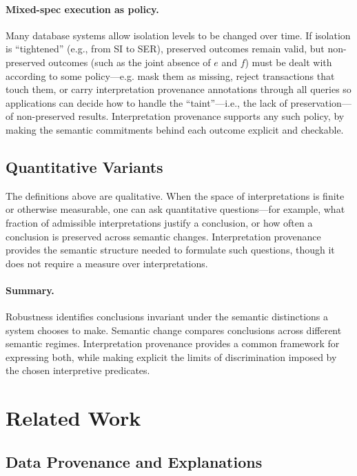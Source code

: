 \documentclass[acmsmall,nonacm]{acmart}
\theoremstyle{remark}
\numberwithin{definition}{section}
\numberwithin{theorem}{section}
\numberwithin{lemma}{section}
\numberwithin{corollary}{section}
\numberwithin{remark}{section}
\numberwithin{example}{section}
\numberwithin{observation}{section}
\numberwithin{assumption}{section}
\begin{document}
\paragraph{Mixed-spec execution as policy.}
Many database systems allow isolation levels to be changed over time.
If isolation is ``tightened'' (e.g., from SI to SER), preserved outcomes remain valid, but
non-preserved outcomes (such as the joint absence of $e$ and $f$) must be dealt with according
to some policy---e.g. mask them as missing, reject transactions that touch them, or
carry interpretation provenance annotations through all queries so applications can decide how
to handle the ``taint''—i.e., the lack of preservation—of non-preserved results.
Interpretation provenance supports any such policy, by making the semantic commitments
behind each outcome explicit and checkable.

\subsection{Quantitative Variants}

The definitions above are qualitative.
When the space of interpretations is finite or otherwise measurable, one can ask
quantitative questions—for example, what fraction of admissible interpretations
justify a conclusion, or how often a conclusion is preserved across semantic
changes.
Interpretation provenance provides the semantic structure needed to formulate such
questions, though it does not require a measure over interpretations.

\paragraph{Summary.}
Robustness identifies conclusions invariant under the semantic distinctions a
system chooses to make.
Semantic change compares conclusions across different semantic regimes.
Interpretation provenance provides a common framework for expressing both, while
making explicit the limits of discrimination imposed by the chosen interpretive
predicates.

\section{Related Work}
\label{sec:related}

\subsection{Data Provenance and Explanations}
\end{document}
